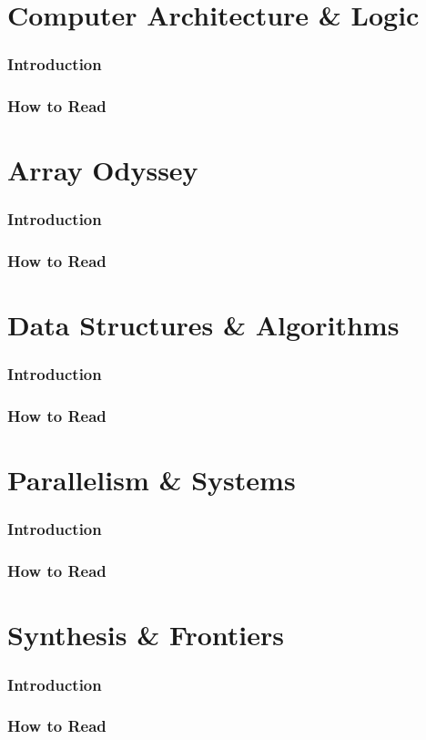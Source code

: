 \documentclass[12pt, oneside, openany]{book}
\begin{document}
\part{Computer Architecture \& Logic}
\section*{Introduction}
\section*{How to Read}
\part{Array Odyssey}
\section*{Introduction}
\section*{How to Read}
\part{Data Structures \& Algorithms}
\section*{Introduction}
\section*{How to Read}
\part{Parallelism \& Systems}
\section*{Introduction}
\section*{How to Read}
\part{Synthesis \& Frontiers}
\section*{Introduction}
\section*{How to Read}



\end{document}
